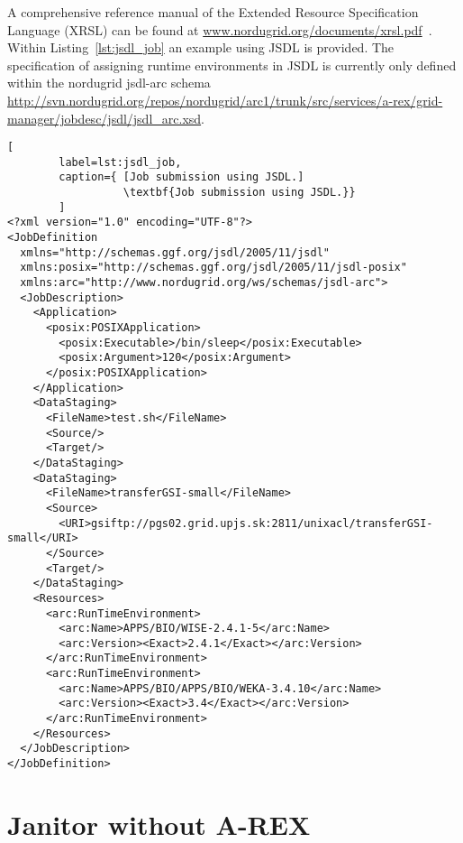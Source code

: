 A comprehensive reference manual of the Extended Resource Specification Language (XRSL) can be
found at \href{www.nordugrid.org/documents/xrsl.pdf}{www.nordugrid.org/documents/xrsl.pdf}~\cite{NORDUGRID_MANUAL_4}.
Within Listing~\ref{lst:jsdl_job} an example using JSDL is provided. The specification of assigning runtime environments in JSDL is 
currently only defined within the nordugrid jsdl-arc schema~
\href{http://svn.nordugrid.org/repos/nordugrid/arc1/trunk/src/services/a-rex/grid-manager/jobdesc/jsdl/jsdl_arc.xsd}
     {http://svn.nordugrid.org/repos/nordugrid/arc1/trunk/src/services/a-rex/grid-manager/jobdesc/jsdl/jsdl\_arc.xsd}.
\begin{lstlisting}[
        label=lst:jsdl_job,
        caption={ [Job submission using JSDL.]
                  \textbf{Job submission using JSDL.}}
        ]
<?xml version="1.0" encoding="UTF-8"?>
<JobDefinition
  xmlns="http://schemas.ggf.org/jsdl/2005/11/jsdl"
  xmlns:posix="http://schemas.ggf.org/jsdl/2005/11/jsdl-posix"
  xmlns:arc="http://www.nordugrid.org/ws/schemas/jsdl-arc">
  <JobDescription>
    <Application>
      <posix:POSIXApplication>
        <posix:Executable>/bin/sleep</posix:Executable>
        <posix:Argument>120</posix:Argument>
      </posix:POSIXApplication>
    </Application>
    <DataStaging>
      <FileName>test.sh</FileName>
      <Source/>
      <Target/>
    </DataStaging>
    <DataStaging>
      <FileName>transferGSI-small</FileName>
      <Source>
        <URI>gsiftp://pgs02.grid.upjs.sk:2811/unixacl/transferGSI-small</URI>
      </Source>
      <Target/>
    </DataStaging>
    <Resources>
      <arc:RunTimeEnvironment>
        <arc:Name>APPS/BIO/WISE-2.4.1-5</arc:Name>
        <arc:Version><Exact>2.4.1</Exact></arc:Version>
      </arc:RunTimeEnvironment>
      <arc:RunTimeEnvironment>
        <arc:Name>APPS/BIO/APPS/BIO/WEKA-3.4.10</arc:Name>
        <arc:Version><Exact>3.4</Exact></arc:Version>
      </arc:RunTimeEnvironment>
    </Resources>
  </JobDescription>
</JobDefinition>
\end{lstlisting}


\section{Janitor without A-REX}

